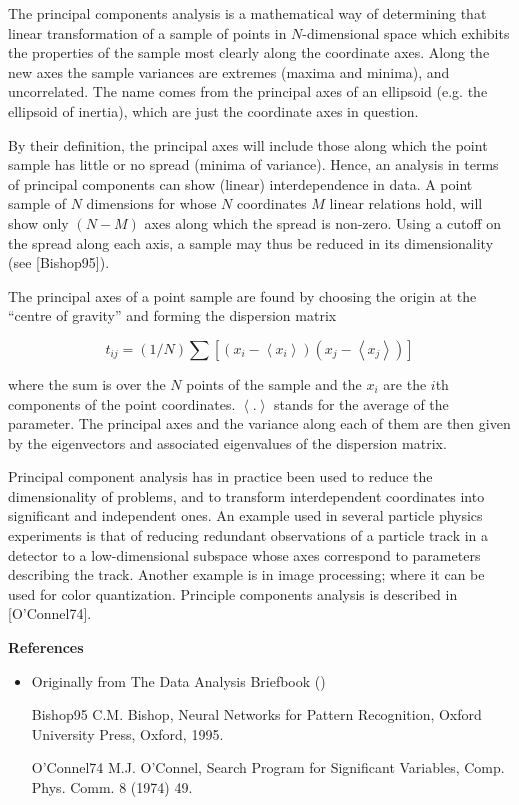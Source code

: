 \documentclass{article}
\begin{document}
The principal components analysis is a mathematical way of determining that linear transformation of a sample of points in $N$-dimensional space which exhibits the properties of the sample most clearly along the coordinate axes. Along the new axes the sample variances are extremes (maxima and minima), and uncorrelated. The name comes from the principal axes of an ellipsoid (e.g. the ellipsoid of inertia), which are just the coordinate axes in question.

By their definition, the principal axes will include those along which the point sample has little or no spread (minima of variance). Hence, an analysis in terms of principal components can show (linear) interdependence in data. A point sample of $N$ dimensions for whose $N$ coordinates $M$ linear relations hold, will show only $(N-M)$ axes along which the spread is non-zero. Using a cutoff on the spread along each axis, a sample may thus be reduced in its dimensionality (see [Bishop95]).

The principal axes of a point sample are found by choosing the origin at the ``centre of gravity'' and forming the dispersion matrix

$$ t_{ij} = (1/N) \sum [(x_i-\left<x_i\right>)(x_j-\left<x_j\right>)] $$

where the sum is over the $N$ points of the sample and the $x_i$ are the $i$th components of the point coordinates. $\left<.\right>$ stands for the average of the parameter. The principal axes and the variance along each of them are then given by the eigenvectors and associated eigenvalues of the dispersion matrix.

Principal component analysis has in practice been used to reduce the dimensionality of problems, and to transform interdependent coordinates into significant and independent ones. An example used in several particle physics experiments is that of reducing redundant observations of a particle track in a detector to a low-dimensional subspace whose axes correspond to parameters describing the track. Another example is in image processing; where it can be used for color quantization. Principle components analysis is described in [O'Connel74].

{\bf References}

\begin{itemize}
\item Originally from The Data Analysis Briefbook
()
\end{itemize}

\begin{itemize}
\item[Bishop95]
C.M. Bishop, Neural Networks for Pattern Recognition, Oxford University Press, Oxford, 1995.
\item[O'Connel74]
M.J. O'Connel, Search Program for Significant Variables, Comp. Phys. Comm. 8 (1974) 49.
\end{itemize}
\end{document}
